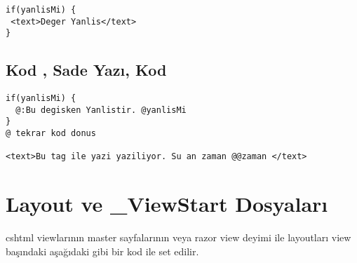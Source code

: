 \documentclass[10pt,a4paper]{article}
\begin{document}
\begin{lstlisting}[label=code-TextAndMarkup,caption=Yazı ve Markup]
if(yanlisMi) {
 <text>Deger Yanlis</text>
}
\end{lstlisting}

\subsection{Kod , Sade Yazı, Kod}

\begin{lstlisting}[label=code-TextAndMarkup,caption=Yazı ve Markup]
if(yanlisMi) {
  @:Bu degisken Yanlistir. @yanlisMi
}
@ tekrar kod donus

<text>Bu tag ile yazi yaziliyor. Su an zaman @@zaman </text>
\end{lstlisting}



\section{Layout ve \_ViewStart Dosyaları}
cshtml viewlarının master sayfalarının veya razor view deyimi ile layoutları
view başındaki aşağıdaki gibi bir kod ile set edilir.










% 

\end{document}
